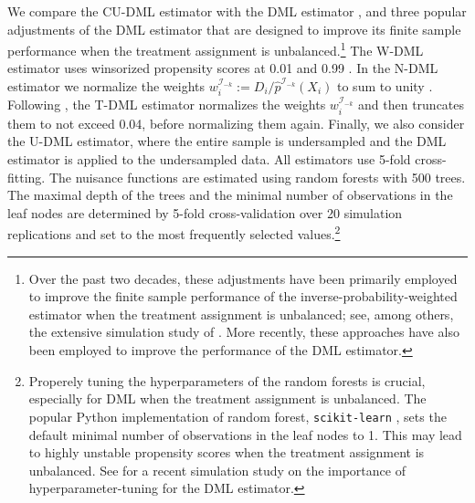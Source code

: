 We compare the CU-DML estimator with the DML estimator \citep{Chernozhukov2018}, and three popular adjustments of the DML estimator that are designed to improve its finite sample performance when the treatment assignment is unbalanced.\footnote{Over the past two decades, these adjustments have been primarily employed to improve the finite sample performance of the inverse-probability-weighted estimator when the treatment assignment is unbalanced; see, among others, the extensive simulation study of \cite{Huber2013}. More recently, these approaches have also been employed to improve the performance of the DML estimator.} The W-DML estimator uses winsorized propensity scores at 0.01 and 0.99 \citep{Imbens2004}. In the N-DML estimator we normalize the weights $w_i^{\mathcal{I}_{-k}} := D_i/\widehat{p}^{\mathcal{I}_{-k}}(X_i)$ to sum to unity \citep[e.g.][]{Wooldridge2018}. Following \cite{Huber2013}, the T-DML estimator normalizes the weights $w_i^{\mathcal{I}_{-k}}$ and then truncates them to not exceed 0.04, before normalizing them again. Finally, we also consider the U-DML estimator, where the entire sample is undersampled and the DML estimator is applied to the undersampled data. All estimators use 5-fold cross-fitting. The nuisance functions are estimated using random forests \citep{Breiman2001} with 500 trees. The maximal depth of the trees and the minimal number of observations in the leaf nodes are determined by 5-fold cross-validation over 20 simulation replications and set to the most frequently selected values.\footnote{Properely tuning the hyperparameters of the random forests is crucial, especially for DML when the treatment assignment is unbalanced. The popular Python implementation of random forest, \texttt{scikit-learn} \citep{scikit-learn}, sets the default minimal number of observations in the leaf nodes to 1. This may lead to highly unstable propensity scores when the treatment assignment is unbalanced. See \cite{Bach2024} for a recent simulation study on the importance of hyperparameter-tuning for the DML estimator.}


